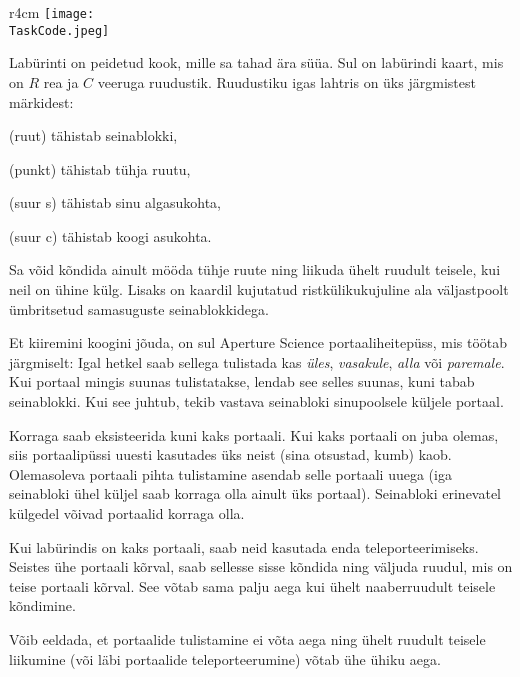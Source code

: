 ﻿\documentclass{boi2014-et}
\renewcommand{\TaskCode}{portals}
\newcommand{\constant}[1]{{\tt #1}}
\begin{document}
    \begin{wrapfigure}[4]{r}{4cm}
        \vspace{-24pt}
        \texttt{[image: \\TaskCode.jpeg]}
    \end{wrapfigure}

    Labürinti on peidetud kook, mille sa tahad ära süüa.
    Sul on labürindi kaart, mis on $R$ rea ja $C$ veeruga ruudustik.
    Ruudustiku igas lahtris on üks järgmistest märkidest:
    \begin{description}[itemindent=1pt]
        \item[\constant{\#}] (ruut) tähistab seinablokki,
        \item[\constant{.}] (punkt) tähistab tühja ruutu,
        \item[\constant{S}] (suur s) tähistab sinu algasukohta,
        \item[\constant{C}] (suur c) tähistab koogi asukohta.
    \end{description}

    Sa võid kõndida ainult mööda tühje ruute ning liikuda ühelt ruudult teisele,
    kui neil on ühine külg. Lisaks on kaardil kujutatud ristkülikukujuline ala
    väljastpoolt ümbritsetud samasuguste seinablokkidega.

    Et kiiremini koogini jõuda, on sul Aperture Science\texttrademark{}
    portaaliheitepüss, mis töötab järgmiselt:
    Igal hetkel saab sellega tulistada kas
    \emph{üles}, \emph{vasakule}, \emph{alla} või \emph{paremale}.
    Kui portaal mingis suunas tulistatakse, lendab see selles suunas, kuni tabab seinablokki.
    Kui see juhtub, tekib vastava seinabloki sinupoolsele küljele portaal.

    Korraga saab eksisteerida kuni kaks portaali. Kui kaks portaali on juba olemas,
    siis portaalipüssi uuesti kasutades üks neist (sina otsustad, kumb) kaob.
    Olemasoleva portaali pihta tulistamine asendab selle portaali uuega
    (iga seinabloki ühel küljel saab korraga olla ainult üks portaal).
    Seinabloki erinevatel külgedel võivad portaalid korraga olla.

    Kui labürindis on kaks portaali, saab neid kasutada enda teleporteerimiseks.
    Seistes ühe portaali kõrval, saab sellesse sisse kõndida ning väljuda ruudul,
    mis on teise portaali kõrval. See võtab sama palju aega kui ühelt naaberruudult teisele kõndimine.

    Võib eeldada, et portaalide tulistamine ei võta aega ning ühelt ruudult teisele liikumine
    (või läbi portaalide teleporteerumine) võtab ühe ühiku aega.
\end{document}
